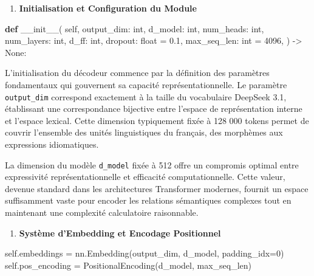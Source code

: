 \documentclass[12pt]{article}
\providecommand{\tightlist}{%
      \setlength{\itemsep}{0pt}\setlength{\parskip}{0pt}}
\newenvironment{Shaded}{}{}
\newcommand{\KeywordTok}[1]{\textcolor[rgb]{0.00,0.44,0.13}{\textbf{{#1}}}}
\newcommand{\DecValTok}[1]{\textcolor[rgb]{0.25,0.63,0.44}{{#1}}}
\newcommand{\FloatTok}[1]{\textcolor[rgb]{0.25,0.63,0.44}{{#1}}}
\newcommand{\FunctionTok}[1]{\textcolor[rgb]{0.02,0.16,0.49}{{#1}}}
\newcommand{\NormalTok}[1]{{#1}}
\newcommand{\VariableTok}[1]{\textcolor[rgb]{0.10,0.09,0.49}{{#1}}}
\newcommand{\OperatorTok}[1]{\textcolor[rgb]{0.40,0.40,0.40}{{#1}}}
\newcommand{\BuiltInTok}[1]{{#1}}
\begin{document}
    \begin{enumerate}
\def\labelenumi{\arabic{enumi}.}
\tightlist
\item
  \textbf{Initialisation et Configuration du Module}
\end{enumerate}

\begin{Shaded}
\begin{Highlighting}[]
\KeywordTok{def} \FunctionTok{\_\_init\_\_}\NormalTok{(}
    \VariableTok{self}\NormalTok{,}
\NormalTok{    output\_dim: }\BuiltInTok{int}\NormalTok{,}
\NormalTok{    d\_model: }\BuiltInTok{int}\NormalTok{,}
\NormalTok{    num\_heads: }\BuiltInTok{int}\NormalTok{,}
\NormalTok{    num\_layers: }\BuiltInTok{int}\NormalTok{,}
\NormalTok{    d\_ff: }\BuiltInTok{int}\NormalTok{,}
\NormalTok{    dropout: }\BuiltInTok{float} \OperatorTok{=} \FloatTok{0.1}\NormalTok{,}
\NormalTok{    max\_seq\_len: }\BuiltInTok{int} \OperatorTok{=} \DecValTok{4096}\NormalTok{,}
\NormalTok{) }\OperatorTok{{-}\textgreater{}} \VariableTok{None}\NormalTok{:}
\end{Highlighting}
\end{Shaded}

L'initialisation du décodeur commence par la définition des paramètres
fondamentaux qui gouvernent sa capacité représentationnelle. Le
paramètre \texttt{output\_dim} correspond exactement à la taille du
vocabulaire DeepSeek 3.1, établissant une correspondance bijective entre
l'espace de représentation interne et l'espace lexical. Cette dimension
typiquement fixée à 128 000 tokens permet de couvrir l'ensemble des
unités linguistiques du français, des morphèmes aux expressions
idiomatiques.

La dimension du modèle \texttt{d\_model} fixée à 512 offre un compromis
optimal entre expressivité représentationnelle et efficacité
computationnelle. Cette valeur, devenue standard dans les architectures
Transformer modernes, fournit un espace suffisamment vaste pour encoder
les relations sémantiques complexes tout en maintenant une complexité
calculatoire raisonnable.

\begin{enumerate}
\def\labelenumi{\arabic{enumi}.}
\setcounter{enumi}{1}
\tightlist
\item
  \textbf{Système d'Embedding et Encodage Positionnel}
\end{enumerate}

\begin{Shaded}
\begin{Highlighting}[]
\VariableTok{self}\NormalTok{.embeddings }\OperatorTok{=}\NormalTok{ nn.Embedding(output\_dim, d\_model, padding\_idx}\OperatorTok{=}\DecValTok{0}\NormalTok{)}
\VariableTok{self}\NormalTok{.pos\_encoding }\OperatorTok{=}\NormalTok{ PositionalEncoding(d\_model, max\_seq\_len)}
\end{Highlighting}
\end{Shaded}
\end{document}
